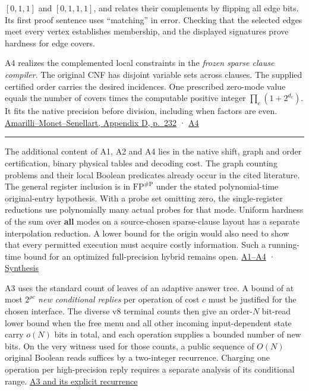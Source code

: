 \documentclass[11pt,a4paper]{article}
\newlength{\OfflineResearchTableWidth}
\newcommand{\OfflineResearchHeaderRule}{\noindent\rule{\linewidth}{0.45pt}\par}
\newcommand{\OfflineResearchRow}{\par}
\newenvironment{OfflineResearchTable}{%
  \par\medskip\begingroup\small\setlength{\parindent}{0pt}%
  \setlength{\parskip}{3pt plus 1pt minus .5pt}%
  \setlength{\OfflineResearchTableWidth}{\linewidth}%
}{%
  \par\endgroup\medskip%
}
\begin{document}
\begin{OfflineResearchTable}
\begin{minipage}[t]{0.31500\OfflineResearchTableWidth}
\([0,1,1]\) and \([0,1,1,1]\), and relates their complements by flipping
all edge bits. Its first proof sentence uses ``matching'' in error.
Checking that the selected edges meet every vertex establishes
membership, and the displayed signatures prove hardness for edge covers.
\end{minipage}\hfill%
\begin{minipage}[t]{0.31500\OfflineResearchTableWidth}\raggedright
A4 realizes the complemented local constraints in the \emph{frozen
sparse clause compiler}. The original CNF has disjoint variable sets
across clauses. The supplied certified order carries the desired
incidences. One prescribed zero-mode value equals the number of covers
times the computable positive integer \(\prod_c(1+2^{d_c})\). It fits
the native precision before division, including when factors are even.
\href{https://pierre.senellart.com/publications/amarilli2017conjunctive.pdf\#page=16}{Amarilli--Monet--Senellart,
Appendix D, p.~232} ·
\hyperref[v9-a4-a-single-fixed-mesh-point-on-the-literal-sparse-clause-branch]{A4}
\end{minipage}%
\OfflineResearchRow
\OfflineResearchHeaderRule
\end{OfflineResearchTable}

The additional content of A1, A2 and A4 lies in the native shift, graph
and order certification, binary physical tables and decoding cost. The
graph counting problems and their local Boolean predicates already occur
in the cited literature. The general register inclusion is in
\(\mathrm{FP}^{\#\mathrm P}\) under the stated polynomial-time
original-entry hypothesis. With a probe set omitting zero, the
single-register reductions use polynomially many actual probes for that
mode. Uniform hardness of the sum over \textbf{all} modes on a
source-chosen sparse-clause layout has a separate interpolation
reduction. A lower bound for the origin would also need to show that
every permitted execution must acquire costly information. Such a
running-time bound for an optimized full-precision hybrid remains open.
\hyperref[v9-section-acquisition-cost]{A1--A4} ·
\hyperref[v9-an-exact-value-can-be-hard-without-being-necessary]{Synthesis}

A3 uses the standard count of leaves of an adaptive answer tree. A bound
of at most \(2^{\rho c}\) \emph{new conditional replies} per operation
of cost \(c\) must be justified for the chosen interface. The diverse v8
terminal counts then give an order-\(N\) bit-read lower bound when the
free menu and all other incoming input-dependent state carry \(o(N)\)
bits in total, and each operation supplies a bounded number of new bits.
On the very witness used for those counts, a public sequence of \(O(N)\)
original Boolean reads suffices by a two-integer recurrence. Charging
one operation per high-precision reply requires a separate analysis of
its conditional range.
\hyperref[v9-a3-what-state-counting-prices-in-an-adaptive-execution]{A3 and
its explicit recurrence}
\end{document}
